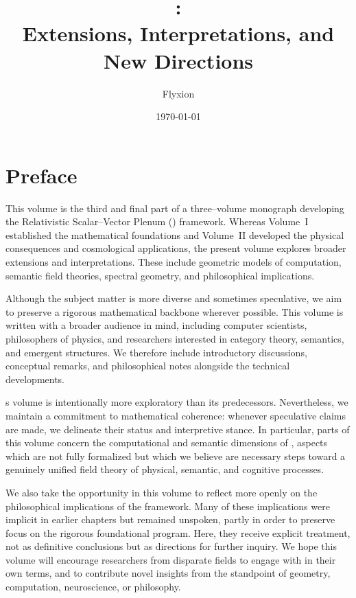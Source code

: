 \documentclass[11pt]{book}
\title{\rsvptitle:\\
Extensions, Interpretations, and New Directions}
\author{Flyxion}
\date{\today}
\begin{document}
\frontmatter
\maketitle

\chapter*{Preface}

This volume is the third and final part of a three--volume monograph
developing the Relativistic Scalar--Vector Plenum (\rsvpabbr{}) framework.
Whereas Volume~I established the mathematical foundations and Volume~II
developed the physical consequences and cosmological applications, the
present volume explores broader extensions and interpretations. These
include geometric models of computation, semantic field theories,
spectral geometry, and philosophical implications.

Although the subject matter is more diverse and sometimes speculative,
we aim to preserve a rigorous mathematical backbone wherever possible.
This volume is written with a broader audience in mind, including
computer scientists, philosophers of physics, and researchers interested
in category theory, semantics, and emergent structures. We therefore
include introductory discussions, conceptual remarks, and philosophical
notes alongside the technical developments.

s volume is intentionally more exploratory than its predecessors.
Nevertheless, we maintain a commitment to mathematical coherence:
whenever speculative claims are made, we delineate their status and
interpretive stance. In particular, parts of this volume concern the
computational and semantic dimensions of \rsvpabbr{}, aspects which are
not fully formalized but which we believe are necessary steps toward
a genuinely unified field theory of physical, semantic, and cognitive
processes.


We also take the opportunity in this volume to reflect more openly on
the philosophical implications of the \rsvpabbr{} framework. Many of
these implications were implicit in earlier chapters but remained
unspoken, partly in order to preserve focus on the rigorous
foundational program. Here, they receive explicit treatment, not as
definitive conclusions but as directions for further inquiry. We hope
this volume will encourage researchers from disparate fields to engage
with \rsvpabbr{} in their own terms, and to contribute novel insights
from the standpoint of geometry, computation, neuroscience, or
philosophy.
\end{document}
